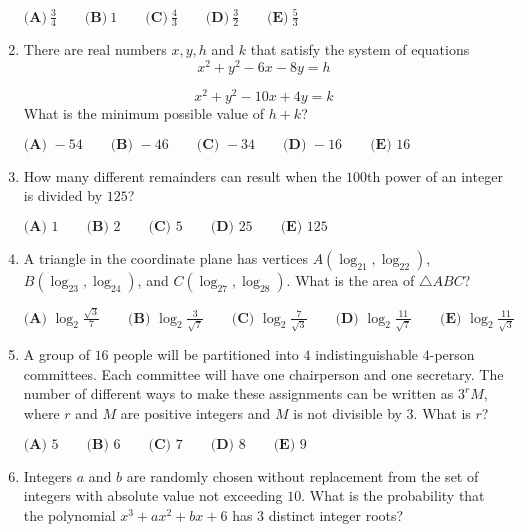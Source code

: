 \documentclass{article}
\begin{document}
\begin{enumerate}[label=\arabic*., itemsep=0.5em]
$\textbf{(A)}~\frac{3}{4}\qquad\textbf{(B)}~1\qquad\textbf{(C)}~\frac{4}{3}\qquad\textbf{(D)}~\frac{3}{2}\qquad\textbf{(E)}~\frac{5}{3}$\par \vspace{0.5em}\item There are real numbers $x,y,h$ and $k$ that satisfy the system of equations
\begin{equation*}
x^2 + y^2 - 6x - 8y = h
\end{equation*}

\begin{equation*}
x^2 + y^2 - 10x + 4y = k
\end{equation*}
What is the minimum possible value of $h+k$?

$
\textbf{(A) }-54 \qquad
\textbf{(B) }-46 \qquad
\textbf{(C) }-34 \qquad
\textbf{(D) }-16 \qquad
\textbf{(E) }16 \qquad
$\par \vspace{0.5em}\item How many different remainders can result when the $100$th power of an integer is divided by $125$?

$\textbf{(A) }1 \qquad\textbf{(B) }2 \qquad\textbf{(C) }5 \qquad\textbf{(D) }25 \qquad\textbf{(E) }125 \qquad$\par \vspace{0.5em}\item A triangle in the coordinate plane has vertices $A(\log_21,\log_22)$, $B(\log_23,\log_24)$, and $C(\log_27,\log_28)$. What is the area of $\triangle ABC$?

$
\textbf{(A) }\log_2\frac{\sqrt3}7\qquad
\textbf{(B) }\log_2\frac3{\sqrt7}\qquad
\textbf{(C) }\log_2\frac7{\sqrt3}\qquad
\textbf{(D) }\log_2\frac{11}{\sqrt7}\qquad
\textbf{(E) }\log_2\frac{11}{\sqrt3}\qquad
$\par \vspace{0.5em}\item A group of $16$ people will be partitioned into $4$ indistinguishable $4$-person committees. Each committee will have one chairperson and one secretary. The number of different ways to make these assignments can be written as $3^{r}M$, where $r$ and $M$ are positive integers and $M$ is not divisible by $3$. What is $r$?

$
\textbf{(A) }5 \qquad
\textbf{(B) }6 \qquad
\textbf{(C) }7 \qquad
\textbf{(D) }8 \qquad
\textbf{(E) }9 \qquad$\par \vspace{0.5em}\item Integers $a$ and $b$ are randomly chosen without replacement from the set of integers with absolute value not exceeding $10$. What is the probability that the polynomial $x^3 + ax^2 + bx + 6$ has $3$ distinct integer roots?


\end{enumerate}
\end{document}
